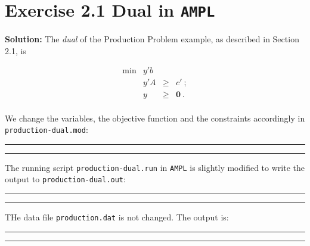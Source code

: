 \section{Exercise 2.1 Dual in {\tt AMPL}}
\textbf{Solution:}
The \emph{dual} of the Production Problem example, as described in Section 2.1, is

\[
\begin{array}{rrcl}
 \min & y'b  &  &   \\
      &  y'A  &   \geq  & c'~; \\
      &  y & \geq & \mathbf{0}~. \\
\end{array}
\]

We change the variables, the objective function and the constraints accordingly in {\tt production-dual.mod}:

\bigskip
\hrule
\small

\normalsize
\hrule
\bigskip

The running script {\tt production-dual.run} in {\tt AMPL} is slightly modified to write the output to {\tt production-dual.out}:

\bigskip
\hrule
\small

\normalsize
\hrule
\bigskip

THe data file {\tt production.dat} is not changed. The output is:

\bigskip
\hrule
\small

\normalsize
\hrule
\bigskip
